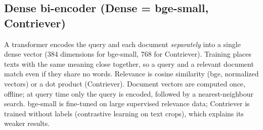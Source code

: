 \subsection{Dense bi-encoder (Dense = bge-small, Contriever)~\cite{karpukhin2020dpr,xiao2023cpack,izacard2022contriever}}
A transformer encodes the query and each document \emph{separately} into a single dense vector
(384 dimensions for bge-small, 768 for Contriever). Training places texts with the same meaning
close together, so a query and a relevant document match even if they share no words. Relevance is
cosine similarity (bge, normalized vectors) or a dot product (Contriever). Document vectors are
computed once, offline; at query time only the query is encoded, followed by a nearest-neighbour
search. bge-small is fine-tuned on large supervised relevance data; Contriever is trained without
labels (contrastive learning on text crops), which explains its weaker results.
\begin{center}\end{center}

